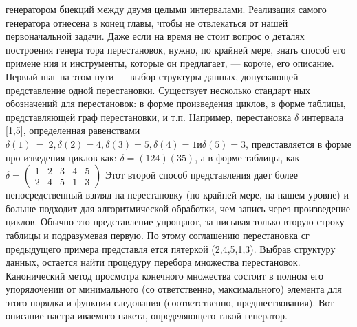 генератором биекций между двумя целыми интервалами. Реализация
самого генератора отнесена в конец главы, чтобы не отвлекаться от
нашей первоначальной задачи.
Даже если на время не стоит вопрос о деталях построения генера­
тора перестановок, нужно, по крайней мере, знать способ его примене­
ния и инструменты, которые он предлагает, — короче, его описание.
Первый шаг на этом пути — выбор структуры данных, допускающей
представление одной перестановки. Существует несколько стандарт­
ных обозначений для перестановок: в форме произведения циклов, в
форме таблицы, представляющей граф перестановки, и т.п. Например,
перестановка $\delta$ интервала [1,5], определенная равенствами $\delta(1)~=~2,
\delta(2) = 4, \delta(3) = 5, \delta(4) = 1 и \delta(5) = 3$, представляется в форме про­
изведения циклов как: $\delta = ( 1 2 4 )( 3 5 )$, а в форме таблицы, как
$\delta = \begin{pmatrix} 1 & 2 & 3 & 4 & 5 \\ 2 & 4 & 5 & 1 & 3 \end{pmatrix} $
Этот второй способ представления дает более
непосредственный взгляд на перестановку (по крайней мере, на нашем
уровне) и больше подходит для алгоритмической обработки, чем запись
через произведение циклов. Обычно это представление упрощают, за­
писывая только вторую строку таблицы и подразумевая первую. По
этому соглашению перестановка сг предыдущего примера представля­
ется пятеркой (2,4,5,1,3).
Выбрав структуру данных, остается найти процедуру перебора
множества перестановок. Канонический метод просмотра конечного
множества состоит в полном его упорядочении от минимального (со­
ответственно, максимального) элемента для этого порядка и функции
следования (соответственно, предшествования). Вот описание настра­
иваемого пакета, определяющего такой генератор.

\newpage

